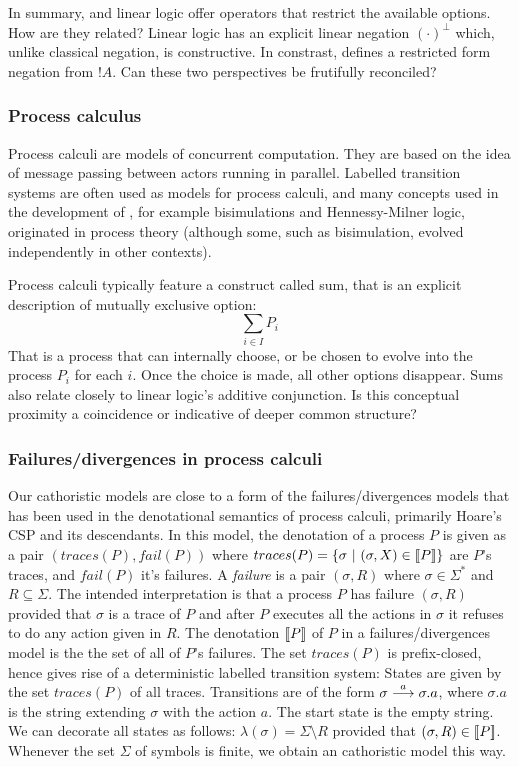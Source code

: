 In summary, \cathoristic{} and linear logic offer  operators that restrict
the available options. How are they related? Linear logic has an
explicit linear negation $(\cdot)^{\bot}$ which, unlike classical
negation, is constructive. In constrast, \cathoristic{} defines a restricted
form negation from $!A$. Can these two perspectives be frutifully
reconciled?

\subsubsection{Process calculus}

Process calculi are models of concurrent computation.  They are based
on the idea of message passing between actors running in parallel.
Labelled transition systems are often used as models for process
calculi, and many concepts used in the development of \cathoristic{},
for example bisimulations and Hennessy-Milner logic, originated in
process theory (although some, such as bisimulation, evolved
independently in other contexts).

Process calculi typically feature a construct called sum, that is an
explicit description of mutually exclusive option:
\[
     \sum_{i \in I} P_i
\]
That is a process that can internally choose, or be chosen to evolve
into the process $P_i$ for each $i$. Once the choice is made, all
other options disappear.  Sums also relate closely to linear logic's
additive conjunction. Is this conceptual proximity a coincidence or
indicative of deeper common structure?


\subsubsection{Failures/divergences in process calculi}

Our cathoristic models are close to a form of the failures/divergences
models that has been used in the denotational semantics of process
calculi, primarily Hoare's CSP \cite{HoareC:comseq,RoscoeAW:theapoc}
and its descendants.  In this model, the denotation of a process $P$
is given as a pair $(traces(P), fail(P))$ where $traces(P) = \{
\sigma\ |\ (\sigma, X) \in \lbrack\!\lbrack P \rbrack\!\rbrack \}$ are $P$'s traces, and
$fail(P)$ it's failures.  A \emph{failure} is a pair $(\sigma, R)$
where $\sigma \in \Sigma^*$ and $R \subseteq \Sigma$. The intended
interpretation is that a process $P$ has failure $(\sigma, R)$
provided that $\sigma$ is a trace of $P$ and after $P$ executes all
the actions in $\sigma$ it refuses to do any action given in $R$. The
denotation $\lbrack\!\lbrack P \rbrack\!\rbrack$ of $P$ in a failures/divergences model is the
the set of all of $P$'s failures. The set $ traces(P)$ is
prefix-closed, hence gives rise of a deterministic labelled transition
system: States are given by the set $traces(P)$ of all traces.
Transitions are of the form $\sigma \stackrel{a}{\longrightarrow} \sigma.a$, where
$\sigma.a$ is the string extending $\sigma$ with the action $a$.  The
start state is the empty string.  We can decorate all states as
follows: $ \lambda (\sigma) = \Sigma \setminus R $ provided that
$(\sigma, R) \in \lbrack\!\lbrack P \rbrack\!\rbrack$.  Whenever the set $\Sigma$ of symbols is
finite, we obtain an cathoristic model this way.

